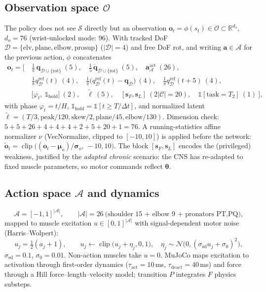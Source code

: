 \documentclass[11pt]{article}
\newcommand{\R}{\mathbb{R}}
\newcommand{\Obs}{\mathcal{O}}
\newcommand{\Act}{\mathcal{A}}
\newcommand{\St}{\mathcal{S}}
\newcommand{\Cset}{\mathcal{C}}
\newcommand{\Dset}{\mathcal{D}}
\newcommand{\qref}{q^{\mathrm{ref}}}
\renewcommand{\vec}[1]{\mathbf{#1}}
\newcommand{\clip}{\operatorname{clip}}
\begin{document}
\subsection{Observation space $\Obs$}
The policy does not see $\St$ directly but an observation $\vec o_t=\phi(s_t)\in\Obs\subset\R^{d_o}$, $d_o=76$ (wrist-unlocked mode: $96$). With tracked DoF $\Dset=\{\text{elv},\text{plane},\text{elbow},\text{prosup}\}$ ($|\Dset|{=}4$) and free DoF $\text{rot}$, and writing $\vec a\in\Act$ for the previous action, $\phi$ concatenates
\begin{align}
\vec o_t=\Big[\ &\tfrac{1}{\pi}\,\vec q_{\Dset\cup\{\text{rot}\}}\ (5),\quad \tfrac{1}{5}\,\dot{\vec q}_{\Dset\cup\{\text{rot}\}}\ (5),\quad \vec a^{\mathrm{act}}_{\Act}\ (26),\nonumber\\
&\tfrac{1}{\pi}\qref_{\Dset}(t)\ (4),\quad \tfrac{1}{\pi}\big(\qref_{\Dset}(t){-}\vec q_{\Dset}\big)\ (4),\quad \tfrac{1}{\pi}\qref_{\Dset}(t{+}5)\ (4),\nonumber\\
&\big[\varphi_t,\ \mathbb 1_{\text{hold}}\big]\ (2),\quad \tilde{\boldsymbol\ell}\ (5),\quad [\vec s_F,\vec s_L]\ (2|\Cset|{=}20),\quad \mathbb 1[\text{task}{=}T_2]\ (1)\ \Big],\label{eq:obs}
\end{align}
with phase $\varphi_t=t/H$, $\mathbb 1_{\text{hold}}=\mathbb 1[t\ge T/\Delta t]$, and normalized latent $\tilde{\boldsymbol\ell}=(T/3,\mathrm{peak}/120,\mathrm{skew}/2,\mathrm{plane}/45,\mathrm{elbow}/130)$. Dimension check: $5{+}5{+}26{+}4{+}4{+}4{+}2{+}5{+}20{+}1=76$. A running-statistics affine normalizer $\nu$ (VecNormalize, clipped to $[-10,10]$) is applied before the network: $\tilde{\vec o}_t=\clip\!\big((\vec o_t-\boldsymbol\mu_o)/\boldsymbol\sigma_o,\,{-}10,10\big)$. The block $[\vec s_F,\vec s_L]$ encodes the (privileged) weakness, justified by the \emph{adapted chronic} scenario: the CNS has re-adapted to fixed muscle parameters, so motor commands reflect $\boldsymbol\theta$.

\subsection{Action space $\Act$ and dynamics}
\begin{equation}
\Act=[-1,1]^{|\Act|},\qquad |\Act|=26\ \text{(shoulder 15 + elbow 9 + pronators PT,PQ)},
\end{equation}
mapped to muscle excitation $u\in[0,1]^{|\Act|}$ with signal-dependent motor noise (Harris--Wolpert):
\begin{equation}
u_j=\tfrac12(a_j+1),\qquad u_j\leftarrow\clip\!\big(u_j+\eta_j,0,1\big),\quad \eta_j\sim\mathcal N\!\big(0,(\sigma_{\mathrm{sd}}u_j+\sigma_0)^2\big),
\end{equation}
$\sigma_{\mathrm{sd}}{=}0.1$, $\sigma_0{=}0.01$. Non-action muscles take $u{=}0$. MuJoCo maps excitation to activation through first-order dynamics ($\tau_{\mathrm{act}}{=}10$\,ms, $\tau_{\mathrm{deact}}{=}40$\,ms) and force through a Hill force--length--velocity model; transition $P$ integrates $F$ physics substeps.
\end{document}

